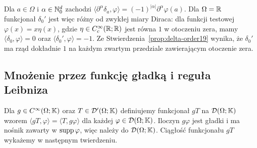 \begin{przyklad}
\label{ex:delta-derivative20}
Dla $a\in\Omega$ i $\alpha\in\mathbb N_0^d$ zachodzi
$\langle\partial^\alpha\delta_a,\varphi\rangle
=(-1)^{|\alpha|}\partial^\alpha\varphi(a)$.
Dla $\Omega=\mathbb R$ funkcjonał $\delta_0'$ jest więc różny
od zwykłej miary Diraca: dla funkcji testowej
$\varphi(x)=x\eta(x)$, gdzie $\eta\in C_c^\infty(\mathbb R;\mathbb R)$
jest równa $1$ w otoczeniu zera, mamy
$\langle\delta_0,\varphi\rangle=0$ oraz
$\langle\delta_0',\varphi\rangle=-1$.
Ze Stwierdzenia~\ref{prop:delta-order19} wynika,
że $\delta_0'$ ma rząd dokładnie $1$ na każdym zwartym
przedziale zawierającym otoczenie zera.
\end{przyklad}

\subsection{Mnożenie przez funkcję gładką i reguła Leibniza}

\begin{definicja}
\label{def:multiply20}
Dla $g\in C^\infty(\Omega;\mathbb K)$ oraz $T\in\mathcal D'(\Omega;\mathbb K)$
definiujemy funkcjonał $gT$ na $\mathcal D(\Omega;\mathbb K)$ wzorem
$\langle gT,\varphi\rangle=\langle T,g\varphi\rangle$
dla każdej $\varphi\in\mathcal D(\Omega;\mathbb K)$.
Iloczyn $g\varphi$ jest gładki i ma nośnik zawarty w
$\operatorname{supp}\varphi$, więc należy do $\mathcal D(\Omega;\mathbb K)$.
Ciągłość funkcjonału $gT$ wykażemy w następnym twierdzeniu.
\end{definicja}

